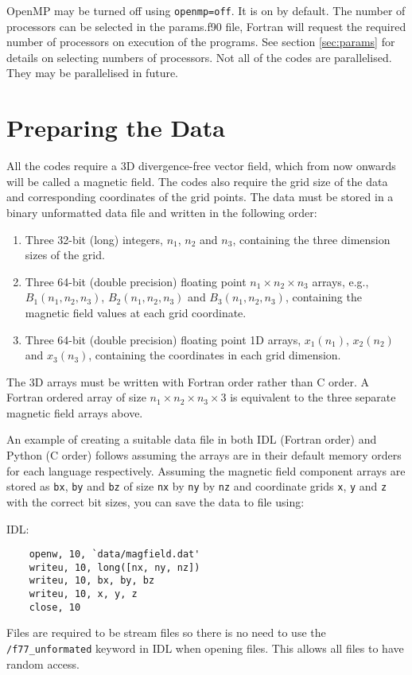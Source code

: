 \documentclass[12pt]{article}
\begin{document}
      OpenMP may be turned off using \texttt{openmp=off}. It is on by default. The number of processors can be selected in the params.f90 file, Fortran will request the required number of processors on execution of the programs. See section \ref{sec:params} for details on selecting numbers of processors. Not all of the codes are parallelised. They may be parallelised in future.

  \section{Preparing the Data}
    \label{sec:prep_data}

    All the codes require a 3D divergence-free vector field, which from now onwards will be called a magnetic field. The codes also require the grid size of the data and corresponding coordinates of the grid points. The data must be stored in a binary unformatted data file and written in the following order:
    \begin{enumerate}
      \item Three 32-bit (long) integers, \( n_1 \), \( n_2 \) and \( n_3 \), containing the three dimension sizes of the grid.
      \item Three 64-bit (double precision) floating point \( n_1 \times n_2 \times n_3 \) arrays, e.g., \( B_1(n_1,n_2,n_3) \), \( B_2(n_1,n_2,n_3) \) and \( B_3(n_1,n_2,n_3) \), containing the magnetic field values at each grid coordinate.
      \item Three 64-bit (double precision) floating point 1D arrays, \( x_1(n_1) \), \( x_2(n_2) \) and \( x_3(n_3) \), containing the coordinates in each grid dimension.
    \end{enumerate}
    The 3D arrays must be written with Fortran order rather than C order. A Fortran ordered array of size \( n_1 \times n_2 \times n_3 \times 3 \) is equivalent to the three separate magnetic field arrays above.

    An example of creating a suitable data file in both IDL (Fortran order) and Python (C order) follows assuming the arrays are in their default memory orders for each language respectively. Assuming the magnetic field component arrays are stored as \texttt{bx}, \texttt{by} and \texttt{bz} of size \texttt{nx} by \texttt{ny} by \texttt{nz} and coordinate grids \texttt{x}, \texttt{y} and \texttt{z} with the correct bit sizes, you can save the data to file using:

    IDL:

    \begin{verbatim}
    openw, 10, `data/magfield.dat'
    writeu, 10, long([nx, ny, nz])
    writeu, 10, bx, by, bz
    writeu, 10, x, y, z
    close, 10
    \end{verbatim}
    Files are required to be stream files so there is no need to use the \texttt{/f77\_unformated} keyword in IDL when opening files. This allows all files to have random access.
\end{document}
